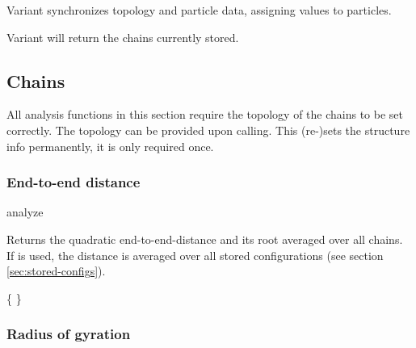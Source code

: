 Variant  synchronizes topology and particle data, assigning  values to particles.

Variant  will return the chains currently stored.



\subsection{Chains}

All analysis functions in this section require the topology of the
chains to be set correctly.  The topology can be provided upon
calling. This (re-)sets the structure info permanently, \ie it is only
required once.

\subsubsection{End-to-end distance}

\begin{essyntax}
  analyze  
\end{essyntax}
Returns the quadratic end-to-end-distance and its root averaged over
all chains.  If  is used, the distance is averaged over all
stored configurations (see section \vref{sec:stored-configs}).

\begin{code}
\{     \}
\end{code}

\subsubsection{Radius of gyration}

